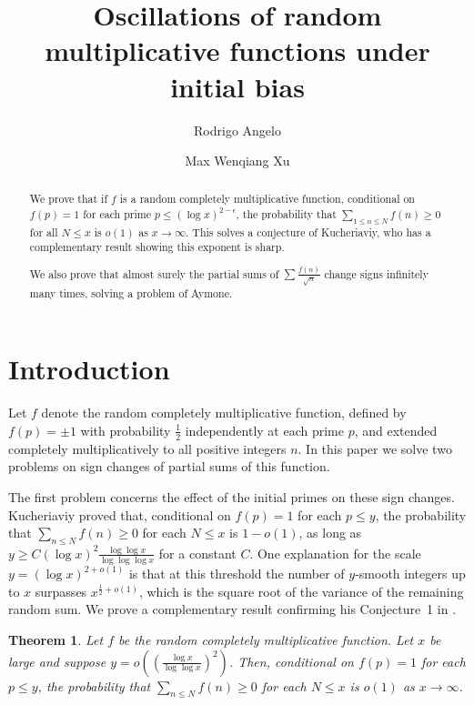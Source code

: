 \documentclass[12pt]{amsart}
\newtheorem{theorem}{Theorem}[section]
\theoremstyle{remark}
\theoremstyle{definition}
\theoremstyle{remark}
\numberwithin{equation}{section}
\begin{document}
	\title{ Oscillations of random multiplicative functions under initial bias}
\author{ Rodrigo Angelo }
\address{São Paulo, SP, Brazil}
\author{Max Wenqiang Xu}
\address{Yau Mathematical Sciences Center, Tsinghua University, Beijing, China}
	\begin{abstract}
We prove that if $f$ is a random completely multiplicative function, conditional on $f(p)=1$ for each prime $p \le (\log x)^{2-\epsilon}$, the probability that $\sum_{1\le n \le N}f(n)\ge 0$ for all $N\le x$ is $o(1)$ as $x \rightarrow \infty$. This solves a conjecture of Kucheriaviy, who has a complementary result showing this exponent is sharp.

We also prove that almost surely the partial sums of $\sum\frac{f(n)}{\sqrt{n}}$ change signs infinitely many times, solving a problem of Aymone.
\end{abstract}
	\maketitle
\section{Introduction}
Let $f$ denote the random completely multiplicative function, defined by $f(p) = \pm 1$ with probability $\frac{1}{2}$ independently at each prime $p$, and extended completely multiplicatively to all positive integers $n$. In this paper we solve two problems on sign changes of partial sums of this function.


The first problem concerns the effect of the initial primes on these sign changes. Kucheriaviy \cite{kucheriaviy2025} proved that, conditional on $f(p) = 1$ for each $p \le y$, the probability that $\sum_{n \le N}f(n) \ge 0$ for each $N \le x$ is $1-o(1)$, as long as $y \ge C (\log x)^2 \frac{\log \log x}{\log \log \log x}$ for a constant $C$. One explanation for the scale $y= (\log x)^{2+o(1)}$ is that at this threshold the number of $y$-smooth integers up to $x$ surpasses $x^{\frac{1}{2}+o(1)}$, which is the square root of the variance of the remaining random sum. We prove a complementary result confirming his Conjecture~1 in \cite{kucheriaviy2025}.

\begin{theorem}\label{maintheorem}
Let $f$ be the random completely multiplicative function. Let $x$ be large and suppose $y = o\left(\left(\frac{\log x}{\log \log x}\right)^2\right)$. Then, conditional on $f(p)=1$ for each $p \le y$, the probability that $\sum_{n \le N} f(n) \ge 0$ for each $N \le x$ is $o(1)$ as $x \rightarrow \infty$.
\end{theorem}
\end{document}
